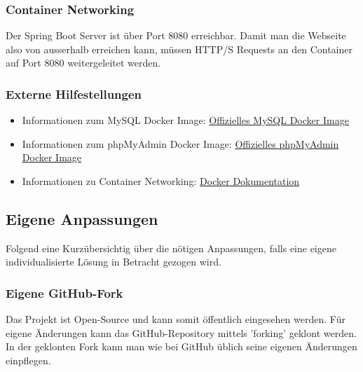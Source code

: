 \documentclass[../main.tex]{subfiles}
\begin{document}
	\subsubsection{Container Networking}
	Der Spring Boot Server ist über Port 8080 erreichbar. Damit man die Webseite also von ausserhalb erreichen kann, müssen HTTP/S Requests an den Container auf Port 8080 weitergeleitet werden.
	
	\subsubsection{Externe Hilfestellungen}
	\begin{itemize}
		\item Informationen zum MySQL Docker Image: \href{https://hub.docker.com/_/mysql}{Offizielles MySQL Docker Image}
		\item Informationen zum phpMyAdmin Docker Image: \href{https://hub.docker.com/r/phpmyadmin/phpmyadmin/}{Offizielles phpMyAdmin Docker Image}
		\item Informationen zu Container Networking: \href{https://docs.docker.com/config/containers/container-networking/}{Docker Dokumentation}
	\end{itemize}
	
	
	\subsection{Eigene Anpassungen}
	Folgend eine Kurzübersichtig über die nötigen Anpassungen, falls eine eigene individualisierte Lösung in Betracht gezogen wird.
	\subsubsection{Eigene GitHub-Fork}
	Das Projekt ist Open-Source und kann somit öffentlich eingesehen werden. Für eigene Änderungen kann das GitHub-Repository mittels 'forking' geklont werden. In der geklonten Fork kann man wie bei GitHub üblich seine eigenen Änderungen einpflegen.
\end{document}
